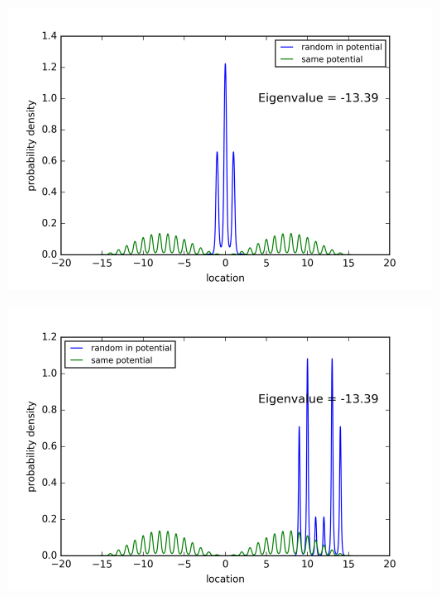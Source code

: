 \begin{figure}[!htbh]
\centering
\begin{minipage}{.45\textwidth}
  \centering
  \includegraphics[width=1.1\linewidth]{RandomPotential2/10_0a_2th_Lowest_Rand0_4_0_5.png}
  \label{fig:randPoa10_2th_0.5_0.4}
\end{minipage}\qquad
\begin{minipage}{.45\textwidth}
  \centering
  \includegraphics[width=1.1\linewidth]{RandomPotential2/10_0a_2th_Lowest_Rand0_2_0_5.png}
  \label{fig:randPoa10_2th_0.5_0.2}
\end{minipage}
\end{figure}


\newpage
